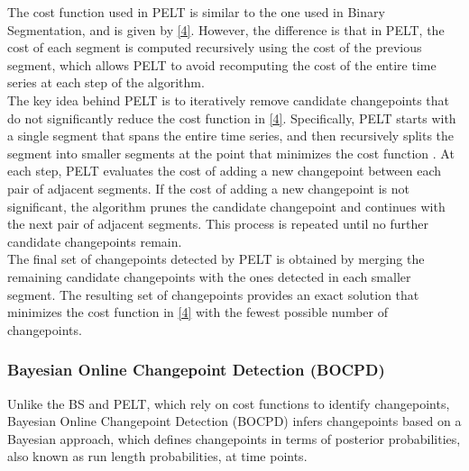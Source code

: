 \documentclass[]{interact}
\theoremstyle{plain}%
\theoremstyle{definition}
\theoremstyle{remark}
\begin{document}
	The cost function used in PELT is similar to the one used in Binary Segmentation, and is given by \autoref{4}. However, the difference is that in PELT, the cost of each segment is computed recursively using the cost of the previous segment, which allows PELT to avoid recomputing the cost of the entire time series at each step of the algorithm. \\
	
	The key idea behind PELT is to iteratively remove candidate changepoints that do not significantly reduce the cost function in \autoref{4}. Specifically, PELT starts with a single segment that spans the entire time series, and then recursively splits the segment into smaller segments at the point that minimizes the cost function \cite{chapmanMetaAnalysisMetricsChange}. At each step, PELT evaluates the cost of adding a new changepoint between each pair of adjacent segments. If the cost of adding a new changepoint is not significant, the algorithm prunes the candidate changepoint and continues with the next pair of adjacent segments. This process is repeated until no further candidate changepoints remain. \\
	
	The final set of changepoints detected by PELT is obtained by merging the remaining candidate changepoints with the ones detected in each smaller segment. The resulting set of changepoints provides an exact solution that minimizes the cost function in \autoref{4} with the fewest possible number of changepoints.
	
	\subsubsection{Bayesian Online Changepoint Detection (BOCPD)} \label{sec:BOCPD}
	
	
	\hspace{0.27cm} Unlike the BS and PELT, which rely on cost functions to identify changepoints, Bayesian Online Changepoint Detection (BOCPD) infers changepoints based on a Bayesian approach, which defines changepoints in terms of posterior probabilities, also known as run length probabilities, at time points. \\
	
\end{document}
